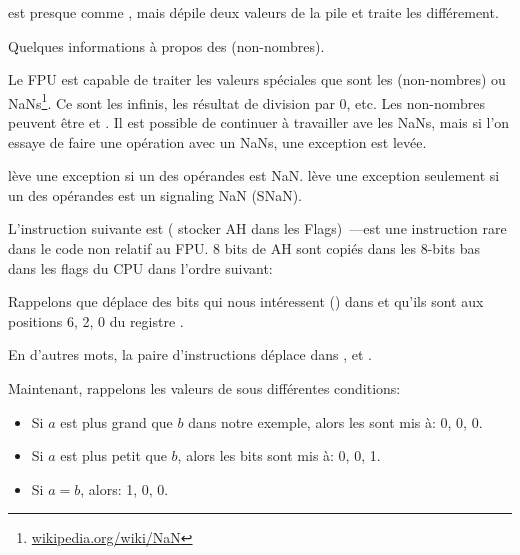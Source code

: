 



\FUCOMPP{} est presque comme \FCOM, mais dépile deux valeurs de la pile et traite
les  différement.

Quelques informations à propos des  (non-nombres).

\newcommand{\NANFN}{\footnote{\href{http://go.yurichev.com/17130}{wikipedia.org/wiki/NaN}}}

Le FPU est capable de traiter les valeurs spéciales que sont les 
(non-nombres) ou \gls{NaN}s\NANFN.
Ce sont les infinis, les résultat de division par 0, etc.
Les non-nombres peuvent être  et . Il est possible de continuer
à travailler ave les  NaNs, mais si l'on essaye de faire une opération avec
un  NaNs, une exception est levée.


\FCOM lève une exception si un des opérandes est \gls{NaN}.
\FUCOM lève une exception seulement si un des opérandes est un signaling \gls{NaN}
(SNaN).

\label{SAHF}

L'instruction suivante est \SAHF ( stocker AH dans les Flags)~---est
une instruction rare dans le code non relatif au FPU.
8 bits de AH sont copiés dans les 8-bits bas dans les flags du CPU dans l'ordre suivant:




Rappelons que \FNSTSW déplace des bits qui nous intéressent (\CThreeBits) dans \AH
et qu'ils sont aux positions 6, 2, 0 du registre \AH.



En d'autres mots, la paire d'instructions  déplace \CThreeBits
dans \ZF, \PF et \CF.

Maintenant, rappelons les valeurs de \CThreeBits sous différentes conditions:

\begin{itemize}
\item Si $a$ est plus grand que $b$ dans notre exemple, alors les \CThreeBits sont
mis à: 0, 0, 0.
\item Si $a$ est plus petit que $b$, alors les bits sont mis à: 0, 0, 1.
\item Si $a=b$, alors: 1, 0, 0.
\end{itemize}

